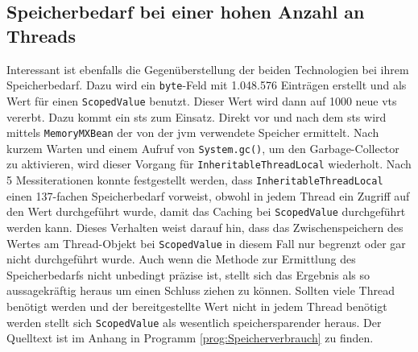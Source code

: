 \subsection{Speicherbedarf bei einer hohen Anzahl an Threads}
\label{sec:Speicherbedarf}

    Interessant ist ebenfalls die Gegenüberstellung der beiden Technologien bei ihrem Speicherbedarf. Dazu wird ein \texttt{byte}-Feld mit 1.048.576 Einträgen erstellt und als Wert für einen
    \texttt{ScopedValue} benutzt. Dieser Wert wird dann auf 1000 neue \Glspl{vt} vererbt. Dazu kommt ein \gls{sts} zum Einsatz. Direkt vor und nach dem \gls{sts} wird mittels 
    \texttt{MemoryMXBean} der von der \gls{jvm} verwendete Speicher ermittelt. Nach kurzem Warten und einem Aufruf von \texttt{System.gc()}, um den Garbage-Collector zu aktivieren, wird 
    dieser Vorgang für \texttt{InheritableThreadLocal} wiederholt. Nach 5 Messiterationen konnte festgestellt werden, dass \texttt{InheritableThreadLocal} einen 137-fachen Speicherbedarf 
    vorweist, obwohl in jedem Thread ein Zugriff auf den Wert durchgeführt wurde, damit das Caching bei \texttt{ScopedValue} durchgeführt werden kann. Dieses Verhalten weist darauf hin, dass
    das Zwischenspeichern des Wertes am Thread-Objekt bei \texttt{ScopedValue} in diesem Fall nur begrenzt oder gar nicht durchgeführt wurde. Auch wenn die Methode zur Ermittlung des Speicherbedarfs 
    nicht unbedingt präzise ist, stellt sich das Ergebnis als so aussagekräftig heraus um einen Schluss ziehen zu können. Sollten viele Thread benötigt werden und der bereitgestellte Wert 
    nicht in jedem Thread benötigt werden stellt sich \texttt{ScopedValue} als wesentlich speichersparender heraus. Der Quelltext ist im Anhang in Programm \ref{prog:Speicherverbrauch} zu finden.
